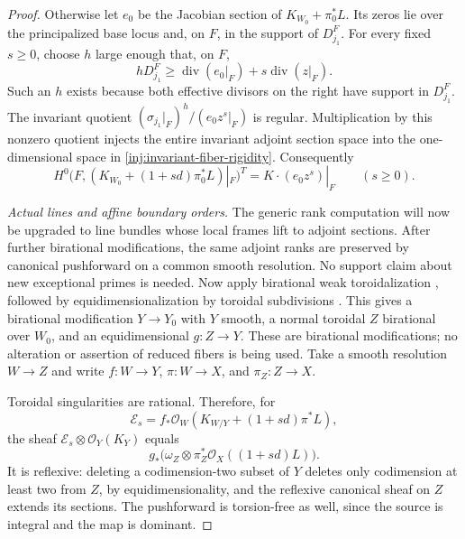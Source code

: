 \begin{proof}
Otherwise let $e_0$ be the Jacobian section of
$K_{W_0}+\pi_0^*L$.  Its zeros lie over the principalized base
locus and, on $F$, in the support of $D_{j_1}^F$.  For every fixed $s\ge0$, choose $h$ large enough that, on $F$,
\[
 hD_{j_1}^F\ge \operatorname{div}(e_0|_F)
                         +s\operatorname{div}(z|_F).
\]
Such an $h$ exists because both effective divisors on the right
have support in $D_{j_1}^F$.  The invariant quotient
$(\sigma_{j_1}|_F)^h/(e_0z^s|_F)$ is regular.  Multiplication
by this nonzero quotient injects the entire invariant adjoint
section space into the one-dimensional space in
\eqref{inj:invariant-fiber-rigidity}.  Consequently
\begin{equation}\label{inj:adjoint-generic-line}
 H^0\bigl(F,(K_{W_0}+(1+sd)\pi_0^*L)|_F\bigr)^T
       =K\cdot(e_0z^s)|_F\qquad(s\ge0).
\end{equation}

\smallskip\noindent\textit{Actual lines and affine boundary orders.}
The generic rank computation will now be upgraded to line bundles
whose local frames lift to adjoint sections. After further birational
modifications, the same adjoint ranks are preserved by canonical pushforward on a common smooth resolution.
No support claim about new exceptional primes is needed.
Now apply birational weak toroidalization
\cite[Theorem 1.1]{ADK2013}, followed by equidimensionalization
by toroidal subdivisions \cite[Proposition 4.4]{AK2000}.
This gives a birational modification $Y\to Y_0$ with $Y$ smooth,
a normal toroidal $Z$ birational over $W_0$, and an equidimensional
$g:Z\to Y$.  These are birational modifications; no alteration
or assertion of reduced fibers is being used.  Take a smooth
resolution $W\to Z$ and write $f:W\to Y$, $\pi:W\to X$,
and $\pi_Z:Z\to X$.

Toroidal singularities are rational.  Therefore, for
\[
 \mathscr E_s=f_*\mathcal O_W(K_{W/Y}+(1+sd)\pi^*L),
\]
the sheaf $\mathscr E_s\otimes\mathcal O_Y(K_Y)$ equals
\[
 g_*\bigl(\omega_Z\otimes
                  \pi_Z^*\mathcal O_X((1+sd)L)\bigr).
\]
It is reflexive: deleting a codimension-two subset of $Y$ deletes
only codimension at least two from $Z$, by equidimensionality,
and the reflexive canonical sheaf on $Z$ extends its sections.
The pushforward is torsion-free as well, since the source is
integral and the map is dominant.


\end{proof}
